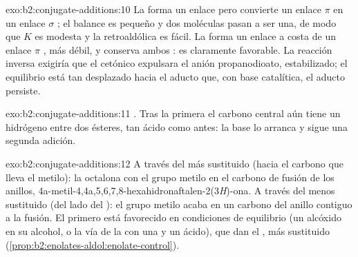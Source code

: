 \begin{solution}{exo:b2:conjugate-additions:10}
La  forma un enlace  pero convierte un enlace $\pi$  en un enlace $\sigma$ ; el
balance es pequeño y dos moléculas pasan a ser una, de modo que $K$ es modesta y la retroaldólica es fácil. La
 forma un enlace  a costa de un enlace $\pi$ , más débil, y conserva ambos
: es claramente favorable. La reacción inversa exigiría que el  cetónico expulsara el anión propanodioato, estabilizado; el
equilibrio está tan desplazado hacia el aducto que, con base catalítica, el aducto persiste.
\end{solution}

\begin{solution}{exo:b2:conjugate-additions:11}
. Tras la primera  el carbono central aún tiene un
hidrógeno entre dos ésteres, tan ácido como antes: la base lo arranca y sigue una segunda adición.
\end{solution}

\begin{solution}{exo:b2:conjugate-additions:12}
A través del  más sustituido (hacia el carbono que lleva el metilo): la octalona con el grupo metilo
en el carbono de fusión de los anillos, 4a-metil-4,4a,5,6,7,8-hexahidronaftalen-2(3\textit{H})-ona. A través
del  menos sustituido (del lado del ): el grupo metilo acaba en un carbono del anillo contiguo a la
fusión. El primero está favorecido en condiciones de equilibrio (un alcóxido en su alcohol, o la vía de la 
con una  y un ácido), que dan el , más sustituido
(\cref{prop:b2:enolates-aldol:enolate-control}).
\end{solution}

